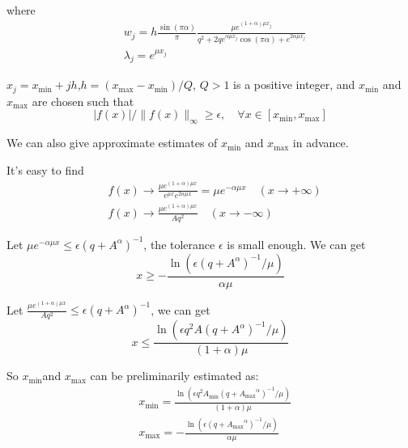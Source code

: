 where
\begin{equation}
	\begin{aligned}
		&w_j=h\frac{\sin(\pi \alpha)}{\pi}\frac{\mu e^{(1+\alpha)\mu x_j}}{q^2+2qe^{\alpha \mu x_j}\cos(\pi\alpha)+e^{2\alpha \mu x_j}}\\
		&\lambda_j=e^{\mu x_j}
	\end{aligned}
\label{lw_SE_q}
\end{equation}

$x_j=x_{\min}+jh$,$h=(x_{\max}-x_{\min})/Q$, $Q>1$ is a positive integer, and $x_{\min}$ and $x_{\max}$ are chosen such that
\begin{equation}
	|f(x)|/\|f(x)\|_{\infty}\ge \epsilon ,\quad \forall x\in[x_{\min},x_{\max}]
	\label{findMN}
\end{equation}

We can also give approximate estimates of $x_{\min}$ and $x_{\max}$ in advance.

It's easy to find
\begin{equation}
	\begin{aligned}
		& f(x)\rightarrow \frac{\mu e^{(1+\alpha)\mu x}}{e^{\mu x}e^{2\alpha\mu x}}=\mu e^{-\alpha \mu x} \quad (x \rightarrow +\infty)\\
		& f(x)\rightarrow \frac{\mu e^{(1+\alpha)\mu x}}{Aq^2} \quad (x \rightarrow -\infty)
	\end{aligned}
	\label{AS_SE}
\end{equation}

Let $\mu e^{-\alpha \mu x}\leq \epsilon (q+{A}^{\alpha})^{-1}$, the tolerance $\epsilon$ is small enough. We can get
\begin{equation}
	x\geq -\frac{\ln(\epsilon (q+{A}^{\alpha})^{-1}/\mu)}{\alpha \mu}
\end{equation}

Let $\frac{\mu e^{(1+\alpha)\mu x}}{Aq^2}  \leq \epsilon (q+{A}^{\alpha})^{-1}$, we can get
\begin{equation}
	x\leq \frac{\ln(\epsilon q^2 A (q+{A}^{\alpha})^{-1}/\mu)}{(1+\alpha)\mu}
\end{equation}

So  $x_{\min}$and $x_{\max}$ can be preliminarily estimated as:
\begin{equation}
	\begin{aligned}
		&x_{\min}= \frac{\ln(\epsilon q^2 A_{\min} (q+{A_{\max}}^{\alpha})^{-1}/\mu)}{(1+\alpha)\mu}\\
		&x_{\max}=-\frac{\ln(\epsilon (q+{A_{\max}}^{\alpha})^{-1}/\mu)}{\alpha \mu}
	\end{aligned}
\label{findminmax_SE_q}
\end{equation}

